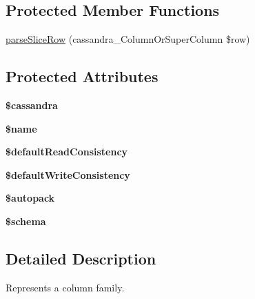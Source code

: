 \subsection*{Protected Member Functions}
\begin{DoxyCompactItemize}
\item 
\hyperlink{classCassandraColumnFamily_a38155d2a31e9559cf0fd85c013cd9d44}{parseSliceRow} (cassandra\_\-ColumnOrSuperColumn \$row)
\end{DoxyCompactItemize}
\subsection*{Protected Attributes}
\begin{DoxyCompactItemize}
\item 
\hypertarget{classCassandraColumnFamily_ab593f9dff20817dec6fd102e9254a0d3}{
{\bfseries \$cassandra}}
\label{classCassandraColumnFamily_ab593f9dff20817dec6fd102e9254a0d3}

\item 
\hypertarget{classCassandraColumnFamily_a4a02130f1fc3cd3574129e89c26536cc}{
{\bfseries \$name}}
\label{classCassandraColumnFamily_a4a02130f1fc3cd3574129e89c26536cc}

\item 
\hypertarget{classCassandraColumnFamily_acd65c8a5e0dd5f198cf5a9c17104666e}{
{\bfseries \$defaultReadConsistency}}
\label{classCassandraColumnFamily_acd65c8a5e0dd5f198cf5a9c17104666e}

\item 
\hypertarget{classCassandraColumnFamily_a3444473a7a9ec0357837157b2a4260de}{
{\bfseries \$defaultWriteConsistency}}
\label{classCassandraColumnFamily_a3444473a7a9ec0357837157b2a4260de}

\item 
\hypertarget{classCassandraColumnFamily_a9d71239b9ab5e6b9eb72de4eb6ee2ed9}{
{\bfseries \$autopack}}
\label{classCassandraColumnFamily_a9d71239b9ab5e6b9eb72de4eb6ee2ed9}

\item 
\hypertarget{classCassandraColumnFamily_a52e47e303a47dc60c6d580dacb558338}{
{\bfseries \$schema}}
\label{classCassandraColumnFamily_a52e47e303a47dc60c6d580dacb558338}

\end{DoxyCompactItemize}


\subsection{Detailed Description}
Represents a column family.

